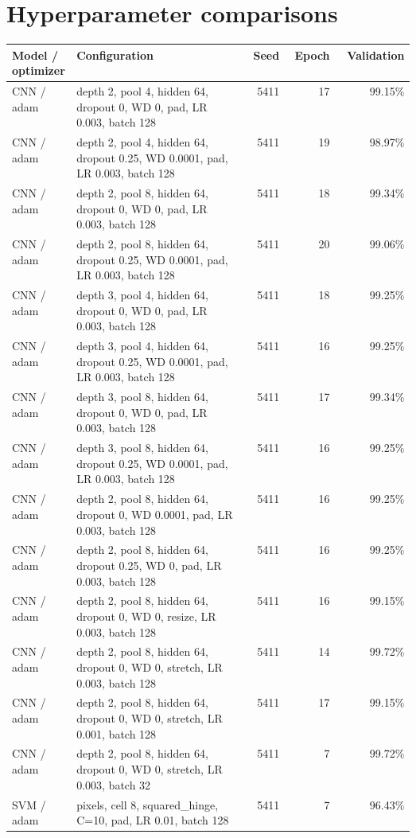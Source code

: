 \section{Hyperparameter comparisons}
\begin{longtable}{@{}p{0.16\linewidth}p{0.43\linewidth}rrr@{}}
\toprule Model / optimizer & Configuration & Seed & Epoch & Validation \\\midrule
\endhead
CNN / adam & depth 2, pool 4, hidden 64, dropout 0, WD 0, pad, LR 0.003, batch 128 & 5411 & 17 & 99.15\% \\
CNN / adam & depth 2, pool 4, hidden 64, dropout 0.25, WD 0.0001, pad, LR 0.003, batch 128 & 5411 & 19 & 98.97\% \\
CNN / adam & depth 2, pool 8, hidden 64, dropout 0, WD 0, pad, LR 0.003, batch 128 & 5411 & 18 & 99.34\% \\
CNN / adam & depth 2, pool 8, hidden 64, dropout 0.25, WD 0.0001, pad, LR 0.003, batch 128 & 5411 & 20 & 99.06\% \\
CNN / adam & depth 3, pool 4, hidden 64, dropout 0, WD 0, pad, LR 0.003, batch 128 & 5411 & 18 & 99.25\% \\
CNN / adam & depth 3, pool 4, hidden 64, dropout 0.25, WD 0.0001, pad, LR 0.003, batch 128 & 5411 & 16 & 99.25\% \\
CNN / adam & depth 3, pool 8, hidden 64, dropout 0, WD 0, pad, LR 0.003, batch 128 & 5411 & 17 & 99.34\% \\
CNN / adam & depth 3, pool 8, hidden 64, dropout 0.25, WD 0.0001, pad, LR 0.003, batch 128 & 5411 & 16 & 99.25\% \\
CNN / adam & depth 2, pool 8, hidden 64, dropout 0, WD 0.0001, pad, LR 0.003, batch 128 & 5411 & 16 & 99.25\% \\
CNN / adam & depth 2, pool 8, hidden 64, dropout 0.25, WD 0, pad, LR 0.003, batch 128 & 5411 & 16 & 99.25\% \\
CNN / adam & depth 2, pool 8, hidden 64, dropout 0, WD 0, resize, LR 0.003, batch 128 & 5411 & 16 & 99.15\% \\
CNN / adam & depth 2, pool 8, hidden 64, dropout 0, WD 0, stretch, LR 0.003, batch 128 & 5411 & 14 & 99.72\% \\
CNN / adam & depth 2, pool 8, hidden 64, dropout 0, WD 0, stretch, LR 0.001, batch 128 & 5411 & 17 & 99.15\% \\
CNN / adam & depth 2, pool 8, hidden 64, dropout 0, WD 0, stretch, LR 0.003, batch 32 & 5411 & 7 & 99.72\% \\
SVM / adam & pixels, cell 8, squared\_hinge, C=10, pad, LR 0.01, batch 128 & 5411 & 7 & 96.43\% \\

\end{longtable}
